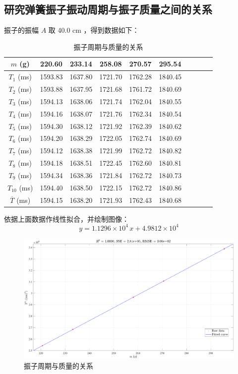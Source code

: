 \documentclass[UTF8]{article}
\theoremstyle{MyLineTheoremStyle} %
\theoremstyle{MyBlockTheoremStyle} %
\theoremstyle{MySubsubsectionStyle} %
\begin{document}
\subsection{研究弹簧振子振动周期与振子质量之间的关系}
    振子的振幅 $A$  取 40.0 cm ，得到数据如下：
\begin{table}[H]\centering
    \caption{振子周期与质量的关系}
    \label{振子周期与质量的关系}
\begin{tabular}{cccccccccc}\toprule
    $m $ (g) & 220.60 & 233.14 & 258.08 & 270.57 & 295.54  \\
    \midrule
    $T_1$ (ms) &1593.83	&1637.80	&1721.70	&1762.28	&1840.45 \\
    $T_2$ (ms) &1593.88	&1637.95	&1721.68	&1761.72	&1840.69 \\
    $T_3$ (ms) &1594.13	&1638.06	&1721.74	&1762.04	&1840.55 \\
    $T_4$ (ms) &1594.16	&1638.07	&1721.76	&1762.34	&1840.54 \\
    $T_5$ (ms) &1594.30	&1638.12	&1721.92	&1762.39	&1840.62 \\
    $T_6$ (ms) &1594.20	&1638.29	&1722.05	&1762.74	&1840.69 \\
    $T_7$ (ms) &1594.12	&1638.38	&1721.99	&1762.72	&1840.82 \\
    $T_8$ (ms) &1594.18	&1638.51	&1722.45	&1762.60	&1840.81 \\
    $T_9$ (ms) &1594.34	&1638.36	&1721.84	&1762.72	&1840.73 \\
    $T_{10}$ (ms) &1594.40	&1638.50	&1722.15	&1762.72	&1840.86 \\
    $\overline{T}$ (ms) &1594.15	&1638.20	&1721.93	&1762.43	&1840.68 \\
    \bottomrule
\end{tabular}
\end{table}
依据上面数据作线性拟合，并绘制图像：
\begin{equation}
y = 1.1296 \times 10^4 \, x + 4.9812 \times 10^4
\end{equation}
\begin{figure}[H]\centering
    \includegraphics[width=0.9\columnwidth]{assets/表3.pdf}
    \caption{振子周期与质量的关系}
\end{figure}
\end{document}
